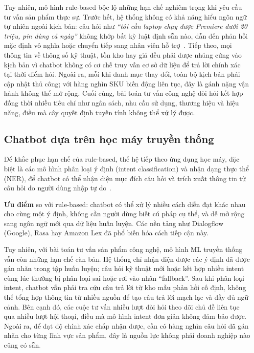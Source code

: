 Tuy nhiên, mô hình rule-based bộc lộ những hạn chế nghiêm trọng khi yêu cầu tư vấn sản phẩm thực sự. Trước hết, hệ thống không có khả năng hiểu ngôn ngữ tự nhiên ngoài kịch bản: câu hỏi như \textit{``tôi cần laptop chạy được Premiere dưới 20 triệu, pin dùng cả ngày''} không khớp bất kỳ luật định sẵn nào, dẫn đến phản hồi mặc định vô nghĩa hoặc chuyển tiếp sang nhân viên hỗ trợ~\cite{folstad2017chatbots}. Tiếp theo, mọi thông tin về thông số kỹ thuật, tồn kho hay giá đều phải được nhúng cứng vào kịch bản vì chatbot không có cơ chế truy vấn cơ sở dữ liệu để trả lời chính xác tại thời điểm hỏi. Ngoài ra, mỗi khi danh mục thay đổi, toàn bộ kịch bản phải cập nhật thủ công; với hàng nghìn SKU biến động liên tục, đây là gánh nặng vận hành không thể mở rộng. Cuối cùng, bài toán tư vấn công nghệ đòi hỏi kết hợp đồng thời nhiều tiêu chí như ngân sách, nhu cầu sử dụng, thương hiệu và hiệu năng, điều mà cây quyết định tuyến tính không thể xử lý được.

\subsection{Chatbot dựa trên học máy truyền thống}
\label{subsec:c2_ml_chatbot}

Để khắc phục hạn chế của rule-based, thế hệ tiếp theo ứng dụng học máy, đặc biệt là các mô hình phân loại ý định (intent classification) và nhận dạng thực thể (NER), để chatbot có thể nhận diện mục đích câu hỏi và trích xuất thông tin từ câu hỏi do người dùng nhập tự do~\cite{chen2021conversational}.

\textbf{Ưu điểm} so với rule-based: chatbot có thể xử lý nhiều cách diễn đạt khác nhau cho cùng một ý định, không cần người dùng biết cú pháp cụ thể, và dễ mở rộng sang ngôn ngữ mới qua dữ liệu huấn luyện. Các nền tảng như Dialogflow (Google), Rasa hay Amazon Lex đã phổ biến hóa cách tiếp cận này.

Tuy nhiên, với bài toán tư vấn sản phẩm công nghệ, mô hình ML truyền thống vẫn còn những hạn chế căn bản. Hệ thống chỉ nhận diện được các ý định đã được gán nhãn trong tập huấn luyện; câu hỏi kỹ thuật mới hoặc kết hợp nhiều intent cùng lúc thường bị phân loại sai hoặc rơi vào nhãn ``fallback''. Sau khi phân loại intent, chatbot vẫn phải tra cứu câu trả lời từ kho mẫu phản hồi cố định, không thể tổng hợp thông tin từ nhiều nguồn để tạo câu trả lời mạch lạc và đầy đủ ngữ cảnh. Bên cạnh đó, các cuộc tư vấn nhiều lượt đòi hỏi theo dõi chủ đề liên tục qua nhiều lượt hội thoại, điều mà mô hình intent đơn giản không đảm bảo được. Ngoài ra, để đạt độ chính xác chấp nhận được, cần có hàng nghìn câu hỏi đã gán nhãn cho từng lĩnh vực sản phẩm, đây là nguồn lực không phải doanh nghiệp nào cũng có sẵn.

